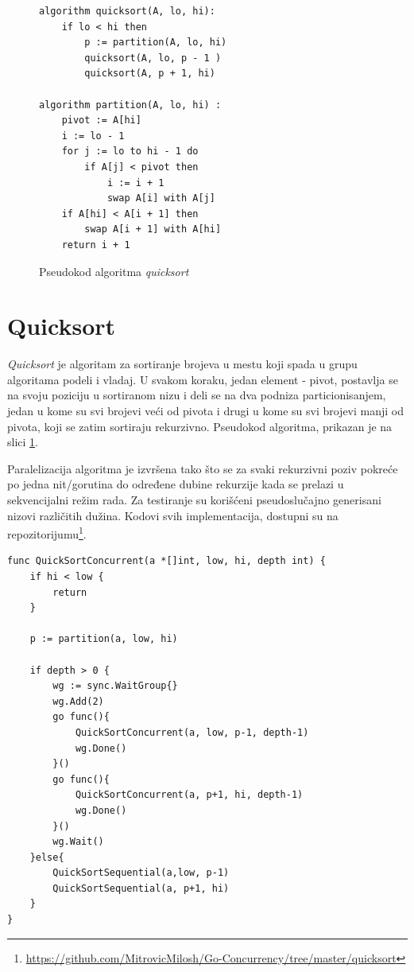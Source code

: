 \documentclass[12pt,oneside]{memoir}
\begin{document}
\begin{figure}
\begin{center}

\begin{Verbatim}[fontsize=\small]
algorithm quicksort(A, lo, hi):
    if lo < hi then
        p := partition(A, lo, hi)
        quicksort(A, lo, p - 1 )
        quicksort(A, p + 1, hi)

algorithm partition(A, lo, hi) :
    pivot := A[hi]
    i := lo - 1    
    for j := lo to hi - 1 do
        if A[j] < pivot then
            i := i + 1
            swap A[i] with A[j]
    if A[hi] < A[i + 1] then
        swap A[i + 1] with A[hi]
    return i + 1
\end{Verbatim}

\caption{Pseudokod algoritma \textit{quicksort}}
\label{fig:qs_pseudo}
\end{center}
\end{figure}

\section{Quicksort}
\textit{Quicksort} je algoritam za sortiranje brojeva u mestu koji spada u grupu algoritama podeli i vladaj. U svakom koraku, jedan element - pivot, postavlja se na svoju poziciju u sortiranom nizu i deli se na dva podniza particionisanjem, jedan u kome su svi brojevi veći od pivota i drugi u kome su svi brojevi manji od pivota, koji se zatim sortiraju rekurzivno.  Pseudokod algoritma, prikazan je na slici \ref{fig:qs_pseudo}. 

Paralelizacija algoritma je izvršena tako što se za svaki rekurzivni poziv pokreće po jedna nit/gorutina do određene dubine rekurzije kada se prelazi u sekvencijalni režim rada. Za testiranje su korišćeni pseudoslučajno generisani nizovi različitih dužina. Kodovi svih implementacija, dostupni su na repozitorijumu\footnote{\url{https://github.com/MitrovicMilosh/Go-Concurrency/tree/master/quicksort}}.


\begin{center}
\begin{lstlisting}[caption=Implementacija konkurentne funkcije \textit{quicksort} u jeziku Go,label={lst:qs},  backgroundcolor=\color{background}]
func QuickSortConcurrent(a *[]int, low, hi, depth int) {
	if hi < low {
		return
	}

	p := partition(a, low, hi)

	if depth > 0 {
		wg := sync.WaitGroup{}
		wg.Add(2)
		go func(){
			QuickSortConcurrent(a, low, p-1, depth-1)
			wg.Done()
		}()
		go func(){
			QuickSortConcurrent(a, p+1, hi, depth-1)
			wg.Done()
		}()
		wg.Wait()
	}else{
		QuickSortSequential(a,low, p-1)
		QuickSortSequential(a, p+1, hi)
	}	
}
\end{lstlisting}
\end{center}
\end{document}
